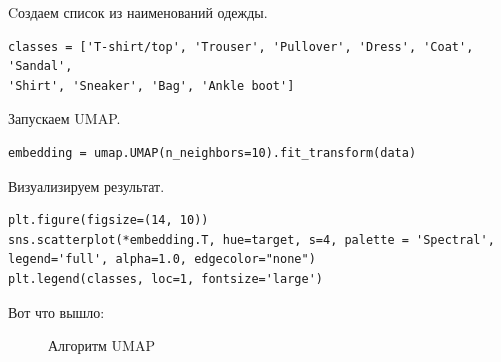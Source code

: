 \begin{itemize}
	Cоздаем список из наименований одежды.
	\begin{verbatim}	
classes = ['T-shirt/top', 'Trouser', 'Pullover', 'Dress', 'Coat', 'Sandal',
'Shirt', 'Sneaker', 'Bag', 'Ankle boot']
	\end{verbatim}	

	Запускаем UMAP.
	\begin{verbatim}
embedding = umap.UMAP(n_neighbors=10).fit_transform(data)
	\end{verbatim}	

	Визуализируем результат.
	\begin{verbatim}
plt.figure(figsize=(14, 10))
sns.scatterplot(*embedding.T, hue=target, s=4, palette = 'Spectral',
legend='full', alpha=1.0, edgecolor="none")
plt.legend(classes, loc=1, fontsize='large')
	\end{verbatim}

Вот что вышло:

\begin{figure}[bh]
	\noindent{}
	\caption{Алгоритм UMAP}
	\label{figCurves}
\end{figure}

\end{itemize}